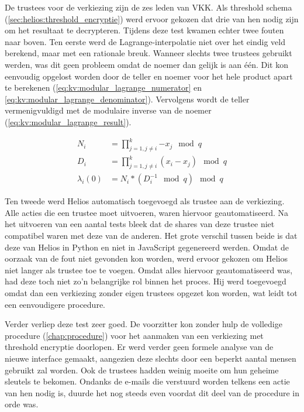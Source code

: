 \npar De trustees voor de verkiezing zijn de zes leden van VKK. Als threshold schema (\ref{sec:helios:threshold_encryptie}) werd ervoor gekozen dat drie van hen nodig zijn om het resultaat te decrypteren. Tijdens deze test kwamen echter twee fouten naar boven. Ten eerste werd de Lagrange-interpolatie niet over het eindig veld berekend, maar met een rationale breuk. Wanneer slechts twee trustees gebruikt werden, was dit geen probleem omdat de noemer dan gelijk is aan \'e\'en. Dit kon eenvoudig opgelost worden door de teller en noemer voor het hele product apart te berekenen (\ref{eq:kv:modular_lagrange_numerator} en \ref{eq:kv:modular_lagrange_denominator}). Vervolgens wordt de teller vermenigvuldigd met de modulaire inverse van de noemer (\ref{eq:kv:modular_lagrange_result}).

\begin{align}
  \label{eq:kv:modular_lagrange_numerator} 
  N_i & = \prod_{j=1, j\not=i}^k{-x_j} \mod{q} \\
  \label{eq:kv:modular_lagrange_denominator}
  D_i & = \prod_{j=1, j\not=i}^k{(x_i - x_j)} \mod{q} \\
  \label{eq:kv:modular_lagrange_result}
  \lambda{_i}(0) & = N_i * (D_i^{-1} \mod{q}) \mod{q}
\end{align}

\npar Ten tweede werd Helios automatisch toegevoegd als trustee aan de verkiezing. Alle acties die een trustee moet uitvoeren, waren hiervoor geautomatiseerd. Na het uitvoeren van een aantal tests bleek dat de shares van deze trustee niet compatibel waren met deze van de anderen. Het grote verschil tussen beide is dat deze van Helios in Python en niet in JavaScript gegenereerd werden. Omdat de oorzaak van de fout niet gevonden kon worden, werd ervoor gekozen om Helios niet langer als trustee toe te voegen. Omdat alles hiervoor geautomatiseerd was, had deze toch niet zo'n belangrijke rol binnen het proces. Hij werd toegevoegd omdat dan een verkiezing zonder eigen trustees opgezet kon worden, wat leidt tot een eenvoudigere procedure.

\npar Verder verliep deze test zeer goed. De voorzitter kon zonder hulp de volledige procedure (\ref{chap:procedure}) voor het aanmaken van een verkiezing met threshold encryptie doorlopen. Er werd verder geen formele analyse van de nieuwe interface gemaakt, aangezien deze slechts door een beperkt aantal mensen gebruikt zal worden. Ook de trustees hadden weinig moeite om hun geheime sleutels te bekomen. Ondanks de e-mails die verstuurd worden telkens een actie van hen nodig is, duurde het nog steeds even voordat dit deel van de procedure in orde was.

